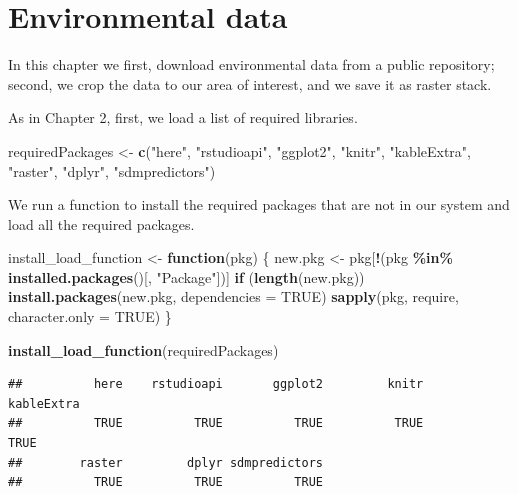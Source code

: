 \documentclass[
]{book}
\newenvironment{Shaded}{\begin{snugshade}}{\end{snugshade}}
\newcommand{\AttributeTok}[1]{\textcolor[rgb]{0.13,0.29,0.53}{#1}}
\newcommand{\ConstantTok}[1]{\textcolor[rgb]{0.56,0.35,0.01}{#1}}
\newcommand{\ControlFlowTok}[1]{\textcolor[rgb]{0.13,0.29,0.53}{\textbf{#1}}}
\newcommand{\FunctionTok}[1]{\textcolor[rgb]{0.13,0.29,0.53}{\textbf{#1}}}
\newcommand{\NormalTok}[1]{#1}
\newcommand{\OtherTok}[1]{\textcolor[rgb]{0.56,0.35,0.01}{#1}}
\newcommand{\SpecialCharTok}[1]{\textcolor[rgb]{0.81,0.36,0.00}{\textbf{#1}}}
\newcommand{\StringTok}[1]{\textcolor[rgb]{0.31,0.60,0.02}{#1}}
\begin{document}
\chapter{Environmental data}\label{environmental-data}

In this chapter we first, download environmental data from a public repository; second, we crop the data to our area of interest, and we save it as raster stack.

As in Chapter 2, first, we load a list of required libraries.

\begin{Shaded}
\begin{Highlighting}[]
\NormalTok{requiredPackages }\OtherTok{\textless{}{-}} \FunctionTok{c}\NormalTok{(}\StringTok{"here"}\NormalTok{, }\StringTok{"rstudioapi"}\NormalTok{,}
    \StringTok{"ggplot2"}\NormalTok{, }\StringTok{"knitr"}\NormalTok{, }\StringTok{"kableExtra"}\NormalTok{, }\StringTok{"raster"}\NormalTok{,}
    \StringTok{"dplyr"}\NormalTok{, }\StringTok{"sdmpredictors"}\NormalTok{)}
\end{Highlighting}
\end{Shaded}

We run a function to install the required packages that are not in our system and load all the required packages.

\begin{Shaded}
\begin{Highlighting}[]
\NormalTok{install\_load\_function }\OtherTok{\textless{}{-}} \ControlFlowTok{function}\NormalTok{(pkg) \{}
\NormalTok{    new.pkg }\OtherTok{\textless{}{-}}\NormalTok{ pkg[}\SpecialCharTok{!}\NormalTok{(pkg }\SpecialCharTok{\%in\%} \FunctionTok{installed.packages}\NormalTok{()[,}
        \StringTok{"Package"}\NormalTok{])]}
    \ControlFlowTok{if}\NormalTok{ (}\FunctionTok{length}\NormalTok{(new.pkg))}
        \FunctionTok{install.packages}\NormalTok{(new.pkg, }\AttributeTok{dependencies =} \ConstantTok{TRUE}\NormalTok{)}
    \FunctionTok{sapply}\NormalTok{(pkg, require, }\AttributeTok{character.only =} \ConstantTok{TRUE}\NormalTok{)}
\NormalTok{\}}

\FunctionTok{install\_load\_function}\NormalTok{(requiredPackages)}
\end{Highlighting}
\end{Shaded}

\begin{verbatim}
##          here    rstudioapi       ggplot2         knitr    kableExtra 
##          TRUE          TRUE          TRUE          TRUE          TRUE 
##        raster         dplyr sdmpredictors 
##          TRUE          TRUE          TRUE
\end{verbatim}
\end{document}
